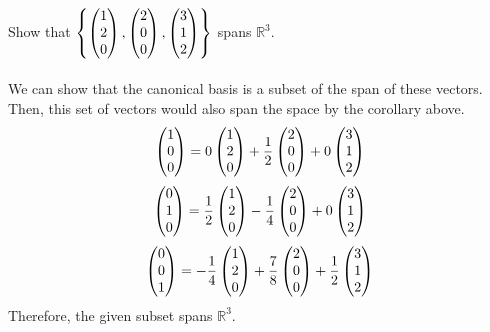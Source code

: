 \documentclass{article}
\newcommand{\0}{\mathbf{0}} %
\begin{document}
Show that $\left \{ \pmqty{1 \\ 2 \\ 0}, \pmqty{2 \\ 0 \\ 0}, \pmqty{3 \\ 1 \\ 2}\right \}$ spans $\mathbb R^3$.
\\\\ 
We can show that the canonical basis is a subset of the span of these vectors. Then, this set of vectors would also span the space by the corollary above.
$$\pmqty{1 \\ 0 \\ 0} = 0\pmqty{1 \\ 2 \\ 0} + \frac12 \pmqty{2 \\ 0 \\ 0} + 0\pmqty{3 \\ 1 \\ 2}$$
$$\pmqty{0 \\ 1 \\ 0} = \frac12 \pmqty{1 \\ 2 \\ 0} -\frac14\pmqty{2 \\ 0 \\ 0} + 0\pmqty{3 \\ 1 \\ 2}$$
$$\pmqty{0 \\ 0 \\ 1} = -\frac14 \pmqty{1 \\ 2 \\ 0} + \frac78 \pmqty{2 \\ 0 \\ 0} + \frac12 \pmqty{3\\ 1 \\ 2}$$
Therefore, the given subset spans $\mathbb R^3$.\\\\ 
\end{document}
